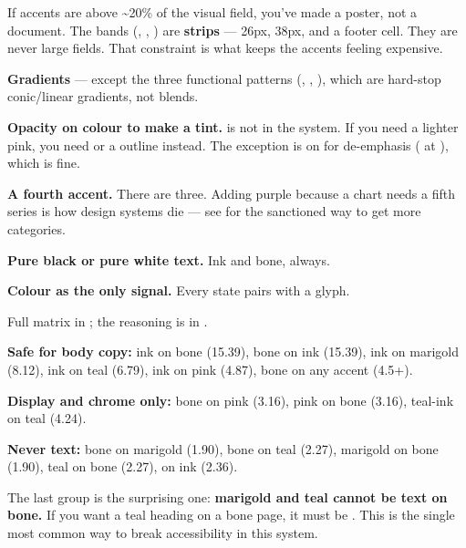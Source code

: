 \documentclass[fontpath=fonts/,logopath=logo/]{riposte-doc}
\begin{document}
If accents are above \textasciitilde{}20\% of the visual field, you've made a poster, not a document. The bands (, , ) are \textbf{strips} — 26px, 38px, and a footer cell. They are never large fields. That constraint is what keeps the accents feeling expensive.



\begin{ripbullets}
\item \textbf{Gradients} — except the three functional patterns (, , ), which are hard-stop conic/linear gradients, not blends.
\item \textbf{Opacity on colour to make a tint.}  is not in the system. If you need a lighter pink, you need  or a  outline instead. The exception is  on  for de-emphasis ( at ), which is fine.
\item \textbf{A fourth accent.} There are three. Adding purple because a chart needs a fifth series is how design systems die — see  for the sanctioned way to get more categories.
\item \textbf{Pure black or pure white text.} Ink and bone, always.
\item \textbf{Colour as the only signal.} Every state pairs with a glyph.
\end{ripbullets}



Full matrix in ; the reasoning is in .

\textbf{Safe for body copy:} ink on bone (15.39), bone on ink (15.39), ink on marigold (8.12), ink on teal (6.79), ink on pink (4.87), bone on any  accent (4.5+).

\textbf{Display and chrome only:} bone on pink (3.16), pink on bone (3.16), teal-ink on teal (4.24).

\textbf{Never text:} bone on marigold (1.90), bone on teal (2.27), marigold on bone (1.90), teal on bone (2.27),  on ink (2.36).

The last group is the surprising one: \textbf{marigold and teal cannot be text on bone.} If you want a teal heading on a bone page, it must be . This is the single most common way to break accessibility in this system.

\ripend
\end{document}
